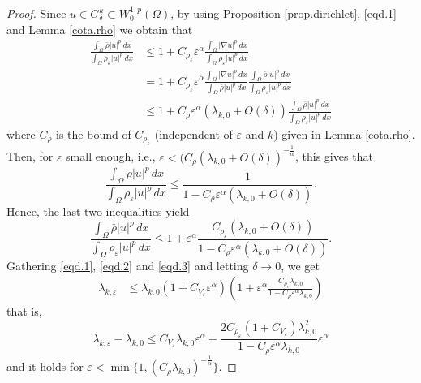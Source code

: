 \documentclass[12pt]{amsart}
\theoremstyle{definition}
\theoremstyle{remark}
\numberwithin{equation}{section}
\begin{document}
\begin{proof}
Since $u\in G_\delta^k\subset W^{1,p}_0(\Omega)$, by using Proposition \ref{prop.dirichlet}, \eqref{eqd.1} and Lemma \ref{cota.rho} we obtain that
\begin{align*}
 \frac{\int_\Omega  \bar \rho |u|^p\,dx}{\int_\Omega  \rho_\varepsilon |u|^p\,dx} &\leq 1 + C_{\rho_\varepsilon} \varepsilon^\alpha  \frac{\int_\Omega |\nabla u|^p\,dx}{\int_\Omega \rho_\varepsilon |u|^p\,dx}\\
&= 1 + C_{\rho_\varepsilon} \varepsilon^\alpha   \frac{\int_\Omega |\nabla u|^p\,dx}{\int_\Omega \bar \rho |u|^p\,dx} \frac{\int_\Omega \bar \rho |u|^p\,dx}{\int_\Omega \rho_\varepsilon |u|^p\,dx}\\
&\leq 1 + C_\rho \varepsilon^\alpha (\lambda_{k,0}+O(\delta)) \frac{\int_\Omega \bar \rho |u|^p\,dx}{\int_\Omega \rho_\varepsilon |u|^p\,dx}
\end{align*}
where $C_\rho$ is the bound of $C_{\rho_\varepsilon}$ (independent of $\varepsilon$ and $k$) given in  Lemma \ref{cota.rho}. Then, for $\varepsilon$ small enough, i.e., $\varepsilon<(C_\rho ( \lambda_{k,0}+O(\delta))^{-\frac{1}{\alpha}}$, this gives that
$$
\frac{\int_\Omega  \bar \rho |u|^p\,dx}{\int_\Omega  \rho_\varepsilon |u|^p\,dx}\leq \frac{1}{1- C_\rho \varepsilon^\alpha  (\lambda_{k,0}+O(\delta))}.
$$
Hence, the last two inequalities yield
\begin{equation} \label{eqd.3}
\frac{\int_\Omega  \bar \rho |u|^p\,dx}{\int_\Omega  \rho_\varepsilon |u|^p\,dx}\leq 1+ \varepsilon^\alpha \frac{ C_{\rho_\varepsilon} (\lambda_{k,0}+O(\delta))}{1- C_\rho\varepsilon^\alpha  (\lambda_{k,0}+O(\delta)) }.
\end{equation}
Gathering \eqref{eqd.1}, \eqref{eqd.2} and \eqref{eqd.3} and letting $\delta\to 0$, we get
\begin{align*}
\lambda_{k,\varepsilon}&\leq \lambda_{k,0}(1 +C_{V_\varepsilon} \varepsilon^\alpha  ) \left( 1+ \varepsilon^\alpha\frac{ C_{\rho_\varepsilon}   \lambda_{k,0}}{1- C_\rho \varepsilon^\alpha   \lambda_{k,0} } \right)
\end{align*}
that is, 
\begin{equation} \label{eq.r.1}
\lambda_{k,\varepsilon}-\lambda_{k,0} \leq C_{V_\varepsilon} \lambda_{k,0} \varepsilon^\alpha +  \frac{2 C_{\rho_\varepsilon} (1+C_{V_\varepsilon}) \lambda_{k,0}^2}{1- C_\rho  \varepsilon^\alpha \lambda_{k,0}}\varepsilon^\alpha
\end{equation}
and it holds for $\varepsilon< \min\{1,( C_\rho\lambda_{k,0})^{-\frac{1}{\alpha}}\}$.



\end{proof}
\end{document}
